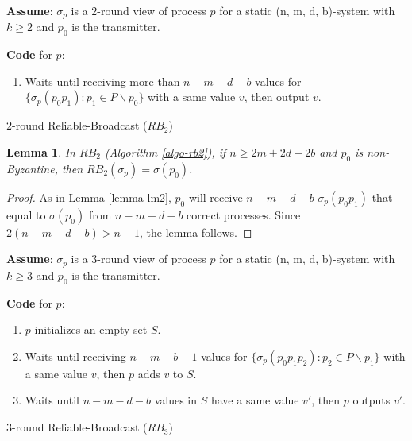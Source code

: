 \documentclass[11pt,conference,compsoc,onecolumn,romanappendices]{IEEEtran}
\newcommand{\tmstrong}[1]{\textbf{#1}}
\newenvironment{enumeratenumeric}{\begin{enumerate}[1.] }{\end{enumerate}}
\newenvironment{fkindent}{\begin{tmparmod}{0.0em}{1.0em}{0pt} }{\end{tmparmod}}
\newenvironment{tmparmod}[3]{\begin{list}{}{\setlength{\topsep}{0pt}\setlength{\leftmargin}{#1}\setlength{\rightmargin}{#2}\setlength{\parindent}{#3}\setlength{\listparindent}{\parindent}\setlength{\itemindent}{\parindent}\setlength{\parsep}{\parskip}} \item[]}{\end{list}}
\newtheorem{lemma}{Lemma}
\begin{document}
\begin{algorithm}[h]
  {\tmstrong{Assume}}: $\sigma_p$ is a $2$-round view of process $p$ for a static
  (n, m, d, b)-system with $k \geqslant 2$ and $p_0$ is the
  transmitter.{\hspace*{\fill}}

  {\tmstrong{Code}} for $p$:
  \begin{fkindent}
  \begin{enumeratenumeric}
    \item Waits until receiving more than $n - m - d - b$ values for
    $\{ \sigma_p (p_0 p_1) : {p_1 \in P \backslash p_0} \}$ with a same value $v$, then
    output $v$.
  \end{enumeratenumeric}
  \end{fkindent}

  \caption{$2$-round Reliable-Broadcast ($R B_2$)\label{algo-rb2}}
\end{algorithm}

\begin{lemma}
  In $R B_2$ (Algorithm \ref{algo-rb2}), if $n \geqslant 2 m + 2 d + 2 b$ and $p_0$
  is non-Byzantine, then $R B_2 (\sigma_p) = \sigma (p_0)$.
\end{lemma}

\begin{proof}
  As in Lemma \ref{lemma-lm2}, $p_0$ will receive $n - m - d - b$ $\sigma_p
  (p_0 p_1)$ that equal to $\sigma (p_0)$ from $n - m - d - b$ correct
  processes. Since $2 ( n - m - d - b ) >
  n - 1$, the lemma follows.
\end{proof}

\begin{algorithm}[h]
  {\tmstrong{Assume}}: $\sigma_p$ is a $3$-round view of process $p$ for a static
  (n, m, d, b)-system with $k \geqslant 3$ and $p_0$ is the
  transmitter.{\hspace*{\fill}}

  {\tmstrong{Code}} for $p$:
  \begin{fkindent}
  \begin{enumeratenumeric}
    \item $p$ initializes an empty set $S$.
    
    \item Waits until receiving $n - m - b - 1$ values for $\{ \sigma_p 
    (p_0 p_1 p_2) : {p_2 \in P \backslash p_1} \}$ with a same value $v$, then $p$ adds 
    $v$ to $S$.
    
    \item Waits until $n - m - d - b$ values in $S$ have a same value $v'$,
    then $p$ outputs $v'$.
  \end{enumeratenumeric}
  \end{fkindent}
  \caption{$3$-round Reliable-Broadcast ($R B_3$)\label{algo-rb3}}
\end{algorithm}
\end{document}
